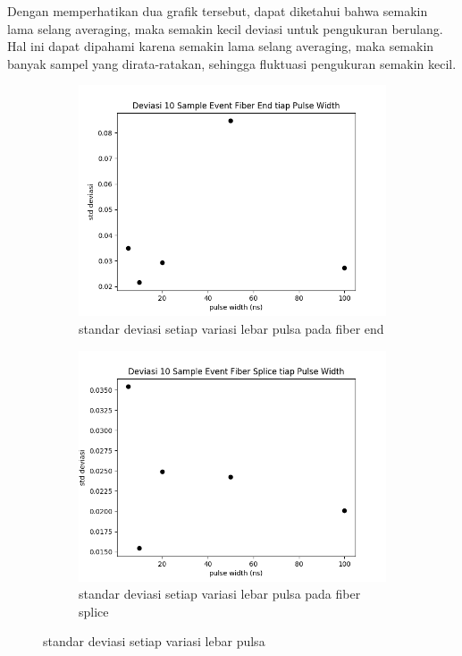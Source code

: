 \documentclass[12pt]{article}
\begin{document}
	Dengan memperhatikan dua grafik tersebut, dapat diketahui bahwa semakin lama selang averaging, maka semakin kecil deviasi untuk pengukuran berulang.
	Hal ini dapat dipahami karena semakin lama selang averaging, maka semakin banyak sampel yang dirata-ratakan, sehingga fluktuasi pengukuran semakin kecil.

	\begin{figure}[!ht]
		\centering
		\captionsetup{justification=centering}
		\begin{subfigure}[b]{0.7\textwidth}
			\includegraphics[width=\textwidth]{images/Bab_4/stddev_pw_end}	
			\caption{\small{standar deviasi setiap variasi lebar pulsa pada fiber end}}		
		\end{subfigure}
		\begin{subfigure}[h]{0.7\textwidth}
			\includegraphics[width=\linewidth]{images/Bab_4/stddev_pw_splice}
			\caption{\small{standar deviasi setiap variasi lebar pulsa pada fiber splice}}			
		\end{subfigure}
		\caption[belum ada judul]{\small{standar deviasi setiap variasi lebar pulsa}}
	\end{figure}
\end{document}
